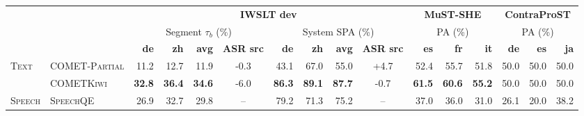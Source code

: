 \begin{table}[t]
\centering
\footnotesize
\setlength{\tabcolsep}{3pt}
\begin{tabular}{ll|rrrc|rrrc|rrr|rrr}
\toprule
 & & \multicolumn{8}{c|}{\textbf{IWSLT dev}} & \multicolumn{3}{c|}{\textbf{MuST-SHE}} & \multicolumn{3}{c}{\textbf{ContraProST}} \\
 & & \multicolumn{4}{c|}{Segment $\tau_b$ (\%)} & \multicolumn{4}{c|}{System SPA (\%)} & \multicolumn{3}{c|}{PA (\%)} & \multicolumn{3}{c}{PA (\%)} \\
\cmidrule(lr){3-6}\cmidrule(lr){7-10}\cmidrule(lr){11-13}\cmidrule(lr){14-16}
 & & \textbf{de} & \textbf{zh} & \textbf{avg} & \multicolumn{1}{c|}{\textbf{ASR src}} & \textbf{de} & \textbf{zh} & \textbf{avg} & \multicolumn{1}{c|}{\textbf{ASR src}} & \textbf{es} & \textbf{fr} & \textbf{it} & \textbf{de} & \textbf{es} & \textbf{ja} \\
\midrule
\multirow{2}{*}{\textsc{Text}} & \textsc{COMET-Partial} & \cellcolor[RGB]{255,255,255}11.2 & \cellcolor[RGB]{255,255,255}12.7 & \cellcolor[RGB]{255,255,255}11.9 & \cellcolor[RGB]{203,221,238}\scriptsize{-0.3} & \cellcolor[RGB]{255,255,255}43.1 & \cellcolor[RGB]{255,255,255}67.0 & \cellcolor[RGB]{255,255,255}55.0 & \cellcolor[RGB]{156,190,223}\scriptsize{+4.7} & \cellcolor[RGB]{253,240,229}52.4 & \cellcolor[RGB]{252,216,188}55.7 & \cellcolor[RGB]{253,230,212}51.8 & \cellcolor[RGB]{255,255,255}50.0 & \cellcolor[RGB]{255,255,255}50.0 & \cellcolor[RGB]{255,255,255}50.0 \\
 & \textsc{COMETKiwi} & \cellcolor[RGB]{183,224,223}\textbf{32.8} & \cellcolor[RGB]{183,224,223}\textbf{36.4} & \cellcolor[RGB]{183,224,223}\textbf{34.6} & \cellcolor[RGB]{255,255,255}\scriptsize{-6.0} & \cellcolor[RGB]{183,224,223}\textbf{86.3} & \cellcolor[RGB]{183,224,223}\textbf{89.1} & \cellcolor[RGB]{183,224,223}\textbf{87.7} & \cellcolor[RGB]{206,223,239}\scriptsize{-0.7} & \cellcolor[RGB]{250,183,132}\textbf{61.5} & \cellcolor[RGB]{250,183,132}\textbf{60.6} & \cellcolor[RGB]{250,183,132}\textbf{55.2} & \cellcolor[RGB]{255,255,255}50.0 & \cellcolor[RGB]{255,255,255}50.0 & \cellcolor[RGB]{255,255,255}50.0 \\
\multirow{2}{*}{\textsc{Speech}} & \textsc{SpeechQE} & \cellcolor[RGB]{203,232,232}26.9 & \cellcolor[RGB]{194,229,228}32.7 & \cellcolor[RGB]{198,230,230}29.8 & -- & \cellcolor[RGB]{195,229,228}79.2 & \cellcolor[RGB]{241,249,248}71.3 & \cellcolor[RGB]{210,236,235}75.2 & -- & \cellcolor[RGB]{255,255,255}37.0 & \cellcolor[RGB]{255,255,255}36.0 & \cellcolor[RGB]{255,255,255}31.0 & \cellcolor[RGB]{255,255,255}26.1 & \cellcolor[RGB]{255,255,255}20.0 & \cellcolor[RGB]{255,255,255}38.2 \\

\end{tabular}
\end{table}
